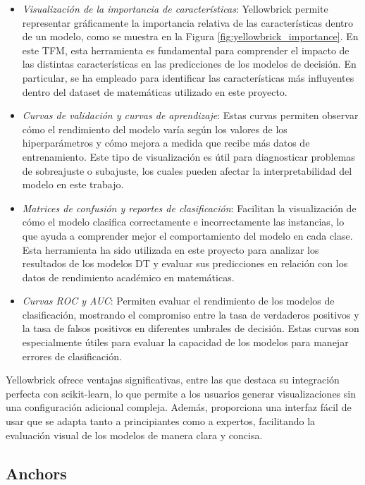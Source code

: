\begin{itemize}
    \item \textit{Visualización de la importancia de características}: Yellowbrick permite representar gráficamente la importancia relativa de las características dentro de un modelo, como se muestra en la Figura \ref{fig:yellowbrick_importance}. En este TFM, esta herramienta es fundamental para comprender el impacto de las distintas características en las predicciones de los modelos de decisión. En particular, se ha empleado para identificar las características más influyentes dentro del dataset de matemáticas utilizado en este proyecto.
    
    \item \textit{Curvas de validación y curvas de aprendizaje}: Estas curvas permiten observar cómo el rendimiento del modelo varía según los valores de los hiperparámetros y cómo mejora a medida que recibe más datos de entrenamiento. Este tipo de visualización es útil para diagnosticar problemas de sobreajuste o subajuste, los cuales pueden afectar la interpretabilidad del modelo en este trabajo.

    \item \textit{Matrices de confusión y reportes de clasificación}: Facilitan la visualización de cómo el modelo clasifica correctamente e incorrectamente las instancias, lo que ayuda a comprender mejor el comportamiento del modelo en cada clase. Esta herramienta ha sido utilizada en este proyecto para analizar los resultados de los modelos DT y evaluar sus predicciones en relación con los datos de rendimiento académico en matemáticas.

    \item \textit{Curvas ROC y AUC}: Permiten evaluar el rendimiento de los modelos de clasificación, mostrando el compromiso entre la tasa de verdaderos positivos y la tasa de falsos positivos en diferentes umbrales de decisión. Estas curvas son especialmente útiles para evaluar la capacidad de los modelos para manejar errores de clasificación.
\end{itemize}

Yellowbrick ofrece ventajas significativas, entre las que destaca su integración perfecta con scikit-learn, lo que permite a los usuarios generar visualizaciones sin una configuración adicional compleja. Además, proporciona una interfaz fácil de usar que se adapta tanto a principiantes como a expertos, facilitando la evaluación visual de los modelos de manera clara y concisa.

\subsection{Anchors}

